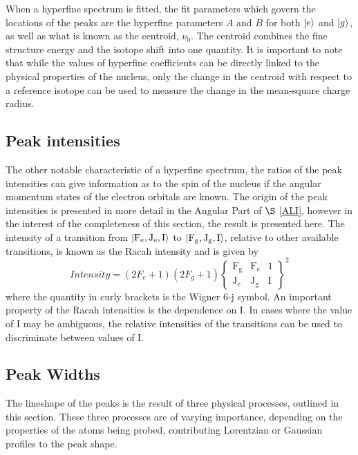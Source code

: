 \noindent When a hyperfine spectrum is fitted, the fit parameters which govern the locations of the peaks are the hyperfine parameters $A$ and $B$ for both $\ket{e}$ and $\ket{g}$, as well as what is known as the centroid, $\nu_0$. The centroid combines the fine structure energy and the isotope shift into one quantity. It is important to note that while the values of hyperfine coefficients can be directly linked to the physical properties of the nucleus, only the change in the centroid with respect to a reference isotope can be used to measure the change in the mean-square charge radius.

\subsection{Peak intensities} 
The other notable characteristic of a hyperfine spectrum, the ratios of the peak intensities can give information as to the spin of the nucleus if the angular momentum states of the electron orbitals are known. The origin of the peak intensities is presented in more detail in the Angular Part of $\S$ \ref{ALI}, however in the interest of the completeness of this section, the result is presented here. The intensity of a transition from $\ket{\mathrm{F_e,J_e,I}}$ to $\ket{\mathrm{F_g,J_g,I}}$, relative to other available transitions, is known as the Racah intensity and is given by
\begin{equation}
Intensity = (2F_e+1)(2F_g+1)
\left\lbrace
\mathrm{
\begin{matrix}
\mathrm{F_g} & \mathrm{F_e} & 1\\
\mathrm{J_e} & \mathrm{J_g} & \mathrm{I} 
\end{matrix}
}
\right\rbrace^2
\label{RACAH}
\end{equation}
where the quantity in curly brackets is the Wigner 6-j symbol\cite{TomT}. An important property of the Racah intensities is the dependence on I. In cases where the value of I may be ambiguous, the relative intensities of the transitions can be used to discriminate between values of I.
\subsection{Peak Widths}
The lineshape of the peaks is the result of three physical processes, outlined in this section. These three processes are of varying importance, depending on the properties of the atoms being probed, contributing Lorentzian or Gaussian profiles to the peak shape. 

